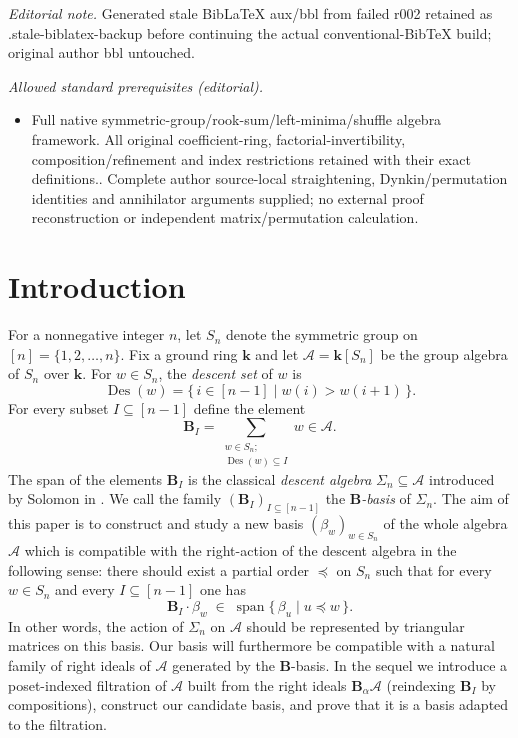 \documentclass[submission]{FPSAC2026}
\newcommand{\kk}{\mathbf{k}} %
\newcommand{\Des}{\operatorname{Des}}
\newcommand{\ive}[1]{\left[ #1 \right]}
\begin{document}
\noindent\textit{Editorial note.} Generated stale BibLaTeX aux/bbl from failed r002 retained as .stale-biblatex-backup before continuing the actual conventional-BibTeX build; original author bbl untouched.\par\medskip
\noindent\textit{Allowed standard prerequisites (editorial).}\begin{itemize}
\item Full native symmetric-group/rook-sum/left-minima/shuffle algebra framework. All original coefficient-ring, factorial-invertibility, composition/refinement and index restrictions retained with their exact definitions.. Complete author source-local straightening, Dynkin/permutation identities and annihilator arguments supplied; no external proof reconstruction or independent matrix/permutation calculation.
\end{itemize}\medskip
\section{Introduction}

For a nonnegative integer \(n\), let \(S_n\) denote the symmetric group on
\([n]=\{1,2,\dots,n\}\).  Fix a ground ring \(\kk\) and let
\(\mathcal{A} = \kk[S_n]\) be the group algebra of \(S_n\) over
\(\kk\). For \(w\in S_n\), the \emph{descent set} of \(w\) is
\[
\Des (w) =\{\, i \in \ive{n-1} \mid w(i)>w(i+1)\,\}.
\]
For every subset \(I\subseteq[n-1]\) define the element
\[
\mathbf{B}_I=\sum_{\substack{w\in S_n;\\ \Des (w) \subseteq I}} w
\in\mathcal{A}.
\]
The span of the elements \(\mathbf{B}_I\) is the classical \emph{descent
algebra} \(\Sigma_n\subseteq\mathcal{A}\) introduced by Solomon in \cite{Sol76}. We call the family
\((\mathbf{B}_I)_{I\subseteq[n-1]}\) the
\emph{\(\mathbf{B}\)-basis} of \(\Sigma_n\).
The aim of this paper is to construct and study a new basis
\((\beta_w)_{w\in S_n}\) of the whole algebra \(\mathcal{A}\) which is
compatible with the right-action of the descent algebra in the following
sense: there should exist a partial order \(\preceq\) on \(S_n\) such that
for every \(w\in S_n\) and every \(I\subseteq[n-1]\) one has
\[
\mathbf{B}_I\cdot \beta_w\;\in\;
\operatorname{span}\{\,\beta_u\mid u\preceq w\,\}.
\]
In other words, the action of \(\Sigma_n\) on \(\mathcal A\) should
be represented by triangular matrices on this basis.
Our basis will furthermore be compatible with a
natural family of right ideals of \(\mathcal A\) generated by the
\(\mathbf{B}\)-basis.  In the sequel we introduce a
poset-indexed filtration of \(\mathcal A\) built from the right ideals
\(\mathbf{B}_\alpha\mathcal A\) (reindexing \(\mathbf{B}_I\) by
compositions), construct our candidate basis, and prove that it is a
basis adapted to the filtration.
\end{document}
